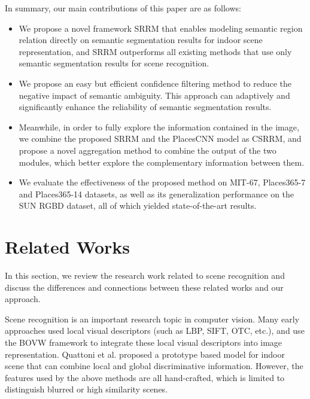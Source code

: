 \documentclass[conference]{IEEEtran}
\begin{document}
In summary, our main contributions of this paper are as follows:
\begin{itemize}
\item We propose a novel framework SRRM that enables modeling semantic region relation directly on semantic segmentation results for indoor scene representation, and SRRM outperforms all existing methods that use only semantic segmentation results for scene recognition.
\item We propose an easy but efficient confidence filtering method to reduce the negative impact of semantic ambiguity. This approach can adaptively and significantly enhance the reliability of semantic segmentation results.
\item Meanwhile, in order to fully explore the information contained in the image, we combine the proposed SRRM and the PlacesCNN model as CSRRM, and propose a novel aggregation method to combine the output of the two modules, which better explore the complementary information between them.
\item We evaluate the effectiveness of the proposed method on MIT-67, Places365-7 and Places365-14 datasets, as well as its generalization performance on the SUN RGBD dataset, all of which yielded state-of-the-art results. 
\end{itemize}

\section{Related Works}

In this section, we review the research work related to scene recognition and discuss the differences and connections between these related works and our approach.

Scene recognition is an important research topic in computer vision. Many early approaches used local visual descriptors (such as LBP\cite{ref2}, SIFT\cite{ref3}, OTC\cite{ref4}, etc.), and use the BOVW framework\cite{ref6} to integrate these local visual descriptors into image representation. Quattoni et al.\cite{ref8} proposed a prototype based model for indoor scene that can combine local and global discriminative information. However, the features used by the above methods are all hand-crafted, which is limited to distinguish blurred or high similarity scenes.
\end{document}
